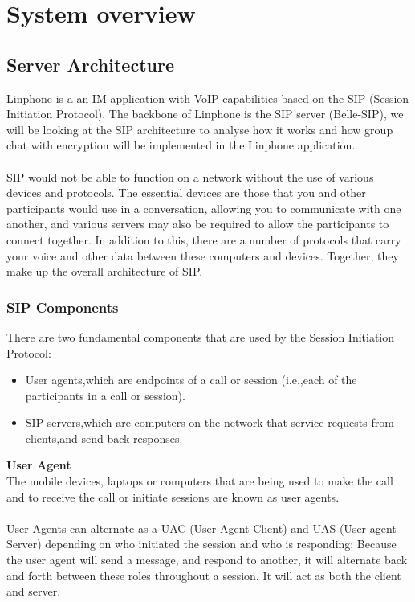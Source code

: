 \documentclass[a4paper]{article}
\begin{document}
\newpage

\section{System overview}
\subsection{Server Architecture}
Linphone is a an IM application with VoIP capabilities based on the SIP (Session Initiation Protocol). The backbone of Linphone is the SIP server (Belle-SIP), we will be looking at the SIP architecture to analyse how it works and how group chat with encryption will be implemented in the Linphone application.\\
\\
SIP would not be able to function on a network without the use  of various devices and protocols. The essential devices are those that you and other participants would use in a conversation, allowing you to communicate with one another, and various servers may also be required to allow the participants to connect together. In addition to this, there are a number of protocols that carry your voice and other data between these computers and devices. Together, they make up the overall architecture of SIP.

\subsubsection{SIP Components}
There are two fundamental components that are used by the Session Initiation
Protocol:

\begin{itemize}
\item User agents,which are endpoints of a call or session (i.e.,each of the participants in a call or session).
\item SIP servers,which are computers on the network that service requests from clients,and send back responses.
\end{itemize}


\textbf{User Agent\\}
The mobile devices, laptops or computers that are being used to make the call and to receive the call or initiate sessions are known as user agents.\\
\\
User Agents can alternate as a UAC (User Agent Client) and UAS (User agent Server) depending on who initiated the session and who is responding; Because the user agent will send a message, and respond to another, it will alternate back and forth between these roles throughout a session. It will act as both the client and server.\\
\\
\end{document}
